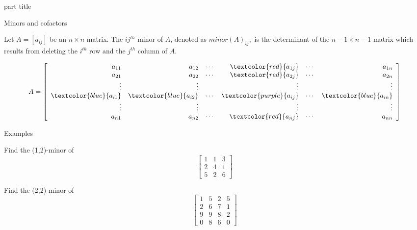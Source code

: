 \documentclass{beamer}
\begin{document}
\begin{frame}
  \begin{beamercolorbox}[sep=12pt,center]{part title}
    \insertsection\par
  \end{beamercolorbox}
\end{frame}

\begin{frame}{Minors and cofactors}
  \begin{definition}
    Let $A = \left[a_{ij} \right]$ be an $n \times n$ matrix. 
    The \alert{$ij^{th}$ minor} of $A$, denoted as
    $minor\left( A\right) _{ij},$ is the determinant
    of the $n-1 \times n-1$ matrix which results from deleting the $i^{th}$ row and
    the $j^{th}$ column of $A$.
  \end{definition}

  \[
    A=
    \left[
      \begin{array}{rrrrrr}
        a_{11} & a_{12} & \cdots & \textcolor{red}{a_{1j}} & \cdots & a_{1n} \\
        a_{21} & a_{22} & \cdots & \textcolor{red}{a_{2j}} & \cdots & a_{2n} \\
        \vdots & \vdots & & \vdots & & \vdots \\
        \textcolor{blue}{a_{i1}} & \textcolor{blue}{a_{i2}} & \cdots & \textcolor{purple}{a_{ij}} & \cdots & \textcolor{blue}{a_{in}} \\
        \vdots & \vdots & & \vdots & & \vdots \\
        a_{n1} & a_{n2} & \cdots & \textcolor{red}{a_{nj}} & \cdots & a_{nn}
      \end{array}
    \right] 
  \]
\end{frame}

\begin{frame}{Examples}
  \begin{example}
    Find the (1,2)-minor of
    \begin{equation*}
      \left[
	\begin{array}{ccc}
          1&1&3\\
          2&4&1\\
          5&2&6
	\end{array}
      \right]
    \end{equation*}
  \end{example}
  \begin{example}
    Find the (2,2)-minor of
    \begin{equation*}
      \left[
	\begin{array}{cccc}
          1&5&2&5\\
          2&6&7&1\\
          9&9&8&2\\
          0&8&6&0
	\end{array}
      \right]
    \end{equation*}
  \end{example}
\end{frame}
\end{document}
